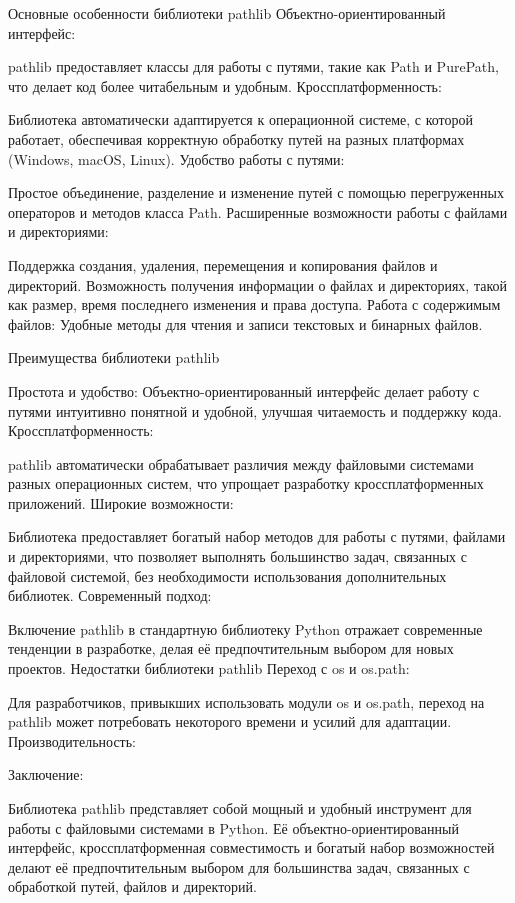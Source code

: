 Основные особенности библиотеки pathlib
Объектно-ориентированный интерфейс:

pathlib предоставляет классы для работы с путями, такие как Path и PurePath, что делает код более читабельным и удобным.
Кроссплатформенность:

Библиотека автоматически адаптируется к операционной системе, с которой работает, обеспечивая корректную обработку путей на разных платформах (Windows, macOS, Linux).
Удобство работы с путями:

Простое объединение, разделение и изменение путей с помощью перегруженных операторов и методов класса Path.
Расширенные возможности работы с файлами и директориями:

Поддержка создания, удаления, перемещения и копирования файлов и директорий.
Возможность получения информации о файлах и директориях, такой как размер, время последнего изменения и права доступа.
Работа с содержимым файлов:
Удобные методы для чтения и записи текстовых и бинарных файлов.

Преимущества библиотеки pathlib

Простота и удобство:
Объектно-ориентированный интерфейс делает работу с путями интуитивно понятной и удобной, улучшая читаемость и поддержку кода.
Кроссплатформенность:

pathlib автоматически обрабатывает различия между файловыми системами разных операционных систем, что упрощает разработку кроссплатформенных приложений.
Широкие возможности:

Библиотека предоставляет богатый набор методов для работы с путями, файлами и директориями, что позволяет выполнять большинство задач, связанных с файловой системой, без необходимости использования дополнительных библиотек.
Современный подход:

Включение pathlib в стандартную библиотеку Python отражает современные тенденции в разработке, делая её предпочтительным выбором для новых проектов.
Недостатки библиотеки pathlib
Переход с os и os.path:

Для разработчиков, привыкших использовать модули os и os.path, переход на pathlib может потребовать некоторого времени и усилий для адаптации.
Производительность:

Заключение:

Библиотека pathlib представляет собой мощный и удобный инструмент для работы с файловыми системами в Python. Её объектно-ориентированный интерфейс, кроссплатформенная совместимость и богатый набор возможностей делают её предпочтительным выбором для большинства задач, связанных с обработкой путей, файлов и директорий.

